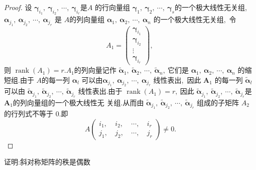 \begin{proof}
	设 $ \boldsymbol{\gamma}_{i_{1}},\  \boldsymbol{\gamma}_{i_{2}},\  \cdots,\  \boldsymbol{\gamma}_{i_{r}}  $是$  A $ 的行向量组  $\boldsymbol{\gamma}_{1},\  \boldsymbol{\gamma}_{2},\  \cdots,\  \boldsymbol{\gamma}_{s}  $的一个极大线性无关组,\   $\boldsymbol{\alpha}_{j_{1}} ,\   \boldsymbol{\alpha}_{j_{2}},\  \cdots,\  \boldsymbol{\alpha}_{j_{r}} $ 是 $A  $的列向量组  $\boldsymbol{\alpha}_{1},\  \boldsymbol{\alpha}_{2},\  \cdots,\  \boldsymbol{\alpha}_{n}$  的一个极大线性无关组,\ 令
	$$A_{1}=\left(\begin{array}{c}
		\boldsymbol{\gamma}_{i_{1}} \\
		\boldsymbol{\gamma}_{i_{2}} \\
		\vdots \\
		\boldsymbol{\gamma}_{i_{r}}
	\end{array}\right),\ $$
	则  $\operatorname{rank}\left(A_{1}\right)=r. A_{1}  $的列向量记作  $\tilde{\boldsymbol{\alpha}}_{1},\  \tilde{\boldsymbol{\alpha}}_{2},\  \cdots,\  \tilde{\boldsymbol{\alpha}}_{n} ,\  $它们是 $ \boldsymbol{\alpha}_{1},\  \boldsymbol{\alpha}_{2},\  \cdots,\  \boldsymbol{\alpha}_{n} $ 的缩短组.由于  $A  $的每一列  $\boldsymbol{\alpha}_{l} $ 可以由$  \boldsymbol{\alpha}_{j_{1}},\  \boldsymbol{\alpha}_{j_{2}},\  \cdots,\  \boldsymbol{\alpha}_{j_{r}} $ 线性表出,\  因此 $ \boldsymbol{A}_{1} $ 的每一列  $\tilde{\boldsymbol{\alpha}}_{l}  $可以由 $ \tilde{\boldsymbol{\alpha}}_{j_{1}},\  \tilde{\boldsymbol{\alpha}}_{j_{2}},\  \cdots,\  \tilde{\boldsymbol{\alpha}}_{j_{r}} $ 线性表出.由于  $\operatorname{rank}\left(A_{1}\right)=r ,\  $因此  $\tilde{\boldsymbol{\alpha}}_{j_{1}},\  \tilde{\boldsymbol{\alpha}}_{j_{2}},\  \cdots,\  \tilde{\boldsymbol{\alpha}}_{j_{r}}  $是$  \boldsymbol{A}_{1}  $的列向量组的一个极大线性无 关组.从而由  $\tilde{\boldsymbol{\alpha}}_{j_{1}},\  \tilde{\boldsymbol{\alpha}}_{j_{2}},\  \cdots,\  \tilde{\boldsymbol{\alpha}}_{j_{r}}$  组成的子矩阵 $ A_{2} $ 的行列式不等于 $0.$即
	$$A\left(\begin{array}{llll}
		i_{1},\  & i_{2},\  & \cdots,\  & i_{r} \\
		j_{1},\  & j_{2},\  & \cdots,\  & j_{r}
	\end{array}\right) \neq 0 .$$
\end{proof}
\newpage
\begin{problem}
	证明:斜对称矩阵的秩是偶数
\end{problem}
